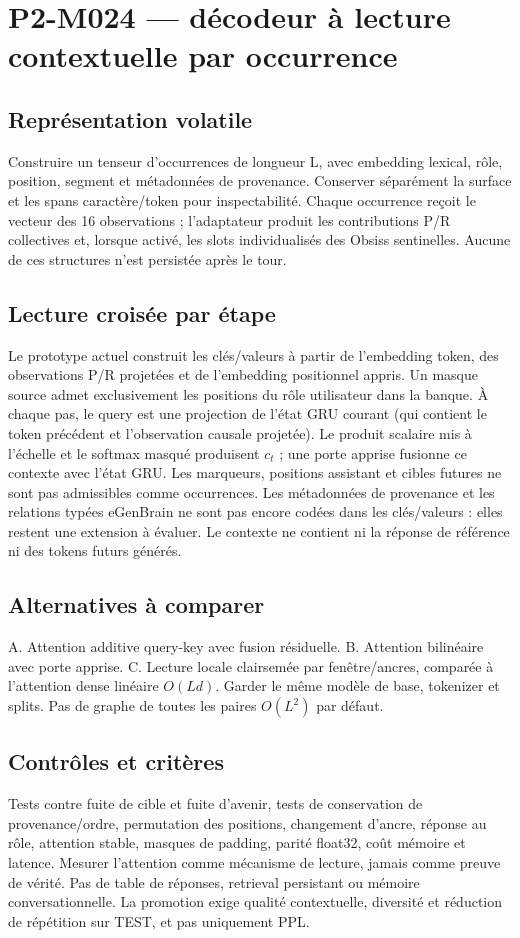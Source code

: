 \documentclass[11pt,a4paper]{report}
\begin{document}
\section*{P2-M024 — décodeur à lecture contextuelle par occurrence}
\subsection*{Représentation volatile}
Construire un tenseur d'occurrences de longueur L, avec embedding lexical, rôle, position, segment et métadonnées de provenance. Conserver séparément la surface et les spans caractère/token pour inspectabilité. Chaque occurrence reçoit le vecteur des 16 observations ; l'adaptateur produit les contributions P/R collectives et, lorsque activé, les slots individualisés des Obsiss sentinelles. Aucune de ces structures n'est persistée après le tour.
\subsection*{Lecture croisée par étape}
Le prototype actuel construit les clés/valeurs à partir de l'embedding token, des observations P/R projetées et de l'embedding positionnel appris. Un masque source admet exclusivement les positions du rôle utilisateur dans la banque. À chaque pas, le query est une projection de l'état GRU courant (qui contient le token précédent et l'observation causale projetée). Le produit scalaire mis à l'échelle et le softmax masqué produisent $c_t$ ; une porte apprise fusionne ce contexte avec l'état GRU. Les marqueurs, positions assistant et cibles futures ne sont pas admissibles comme occurrences. Les métadonnées de provenance et les relations typées eGenBrain ne sont pas encore codées dans les clés/valeurs : elles restent une extension à évaluer. Le contexte ne contient ni la réponse de référence ni des tokens futurs générés.
\subsection*{Alternatives à comparer}
A. Attention additive query-key avec fusion résiduelle. B. Attention bilinéaire avec porte apprise. C. Lecture locale clairsemée par fenêtre/ancres, comparée à l'attention dense linéaire $O(Ld)$. Garder le même modèle de base, tokenizer et splits. Pas de graphe de toutes les paires $O(L^2)$ par défaut.
\subsection*{Contrôles et critères}
Tests contre fuite de cible et fuite d'avenir, tests de conservation de provenance/ordre, permutation des positions, changement d'ancre, réponse au rôle, attention stable, masques de padding, parité float32, coût mémoire et latence. Mesurer l'attention comme mécanisme de lecture, jamais comme preuve de vérité. Pas de table de réponses, retrieval persistant ou mémoire conversationnelle. La promotion exige qualité contextuelle, diversité et réduction de répétition sur TEST, et pas uniquement PPL.
\end{document}
